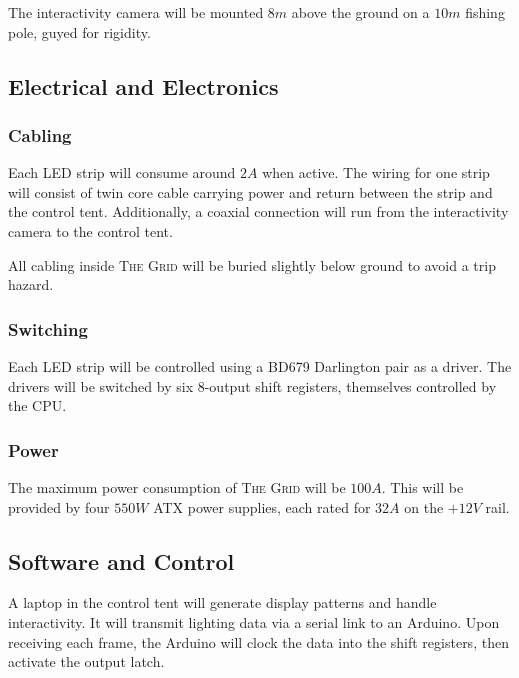 \documentclass[12pt]{article} %
\begin{document}
The interactivity camera will be mounted $8m$ above the ground on a $10m$ fishing pole, guyed for rigidity.

\subsection{Electrical and Electronics}
\subsubsection{Cabling}
Each LED strip will consume around $2A$ when active.  The wiring for one strip will consist of twin core cable carrying power and return between the strip and the control tent.  Additionally, a coaxial connection will run from the interactivity camera to the control tent.

All cabling inside \textsc{The Grid} will be buried slightly below ground to avoid a trip hazard.

\subsubsection{Switching}
Each LED strip will be controlled using a BD679 Darlington pair as a driver.  The drivers will be switched by six 8-output shift registers, themselves controlled by the CPU.

\subsubsection{Power}
The maximum power consumption of \textsc{The Grid} will be $100A$.  This will be provided by four $550W$ ATX power supplies, each rated for $32A$ on the $+12V$ rail.

\subsection{Software and Control}
A laptop in the control tent will generate display patterns and handle interactivity.  It will transmit lighting data via a serial link to an Arduino.  Upon receiving each frame, the Arduino will clock the data into the shift registers, then activate the output latch.
\end{document}
